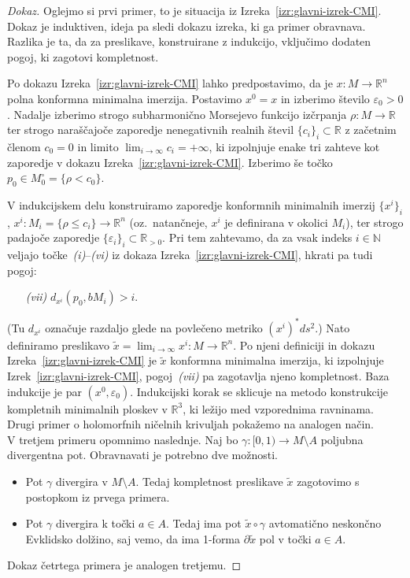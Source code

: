 \documentclass[12pt,a4paper,twoside]{article}
\theoremstyle{definition} %
\newenvironment{dokaz}[1][Dokaz]{\begin{proof}[#1]}{\end{proof}}
\theoremstyle{plain} %
\numberwithin{equation}{section}  %
\newcommand{\R}{\mathbb R}
\newcommand{\N}{\mathbb N}
\begin{document}
\begin{dokaz}
Oglejmo si prvi primer, to je situacija iz Izreka~\ref{izr:glavni-izrek-CMI}. 
Dokaz je induktiven, ideja pa sledi dokazu izreka, ki ga primer obravnava. Razlika je ta, da za preslikave, konstruirane z indukcijo, vključimo dodaten pogoj, ki zagotovi kompletnost.

Po dokazu Izreka~\ref{izr:glavni-izrek-CMI} lahko predpostavimo, da je $x \colon M \to \R^{n}$ polna konformna minimalna imerzija. 
Postavimo $x^0 = x$ in izberimo število $\varepsilon_{0}>0$. 
Nadalje izberimo strogo subharmonično Morsejevo funkcijo izčrpanja $\rho \colon M \to \R$ ter strogo naraščajoče zaporedje nenegativnih realnih števil $\{ c_{i} \}_{i} \subset \R$ z začetnim členom $c_0 = 0$ in limito $\lim_{i \to \infty}c_{i} = +\infty$, ki izpolnjuje enake tri zahteve kot zaporedje v dokazu Izreka~\ref{izr:glavni-izrek-CMI}.
Izberimo še točko $p_0 \in M_{0}^{\circ} = \{ \rho < c_0 \}$.

V indukcijskem delu konstruiramo zaporedje konformnih minimalnih imerzij $\{ x^{i} \}_{i}$, $x^{i}\colon M_{i} = \{ \rho \leq c_{i} \} \to \R^{n}$ (oz.~natančneje, $x^{i}$ je definirana v okolici $M_{i}$), ter strogo padajoče zaporedje $\{ \varepsilon_{i} \}_{i} \subset \R_{>0}$.
Pri tem zahtevamo, da za vsak indeks $i \in \N$ veljajo točke~\textit{(i)}--\textit{(vi)} iz dokaza Izreka~\ref{izr:glavni-izrek-CMI}, hkrati pa tudi pogoj:
\begin{itemize}
\item[\textit{(vii)}] $d_{x^{i}}(p_0, bM_{i}) > i$.
\end{itemize}
(Tu $d_{x^{i}}$ označuje razdaljo glede na povlečeno metriko $(x^{i})^{*}ds^2$.) \newline
Nato definiramo preslikavo $\tilde{x} = \lim_{i \to \infty}x^{i} \colon M \to \R^{n}$. Po njeni definiciji in dokazu Izreka~\ref{izr:glavni-izrek-CMI} je $\tilde{x}$ konformna minimalna imerzija, ki izpolnjuje Izrek~\ref{izr:glavni-izrek-CMI}, pogoj~\textit{(vii)} pa zagotavlja njeno kompletnost. \newline
Baza indukcije je par $(x^{0}, \varepsilon_{0})$.
Indukcijski korak se sklicuje na metodo konstrukcije kompletnih minimalnih ploskev v $\R^3$, ki ležijo med vzporednima ravninama. \\[0.3cm]
%
Drugi primer o holomorfnih ničelnih krivuljah pokažemo na analogen način. \\[0.3cm]
%
V tretjem primeru opomnimo naslednje. Naj bo $\gamma \colon [0,1) \to M \setminus A$ poljubna divergentna pot. Obravnavati je potrebno dve možnosti.
\begin{itemize}
\item Pot $\gamma$ divergira v $M \setminus A$. Tedaj kompletnost preslikave $\tilde{x}$ zagotovimo s postopkom iz prvega primera.
\item Pot $\gamma$ divergira k točki $a \in A$. Tedaj ima pot $\tilde{x} \circ \gamma$ avtomatično neskončno Evklidsko dolžino, saj vemo, da ima 1-forma
	$\partial \tilde{x}$ pol v točki $a \in A$.
\end{itemize}
Dokaz četrtega primera je analogen tretjemu.
\end{dokaz}
\end{document}
